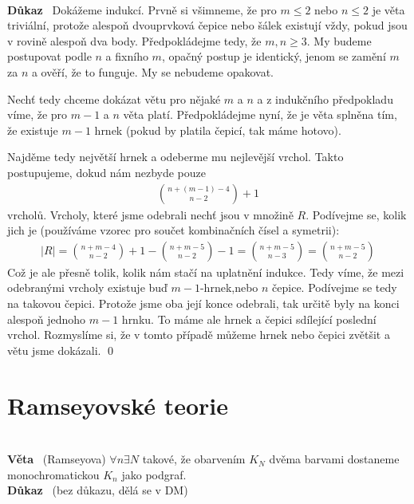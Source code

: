 \documentclass{article}
\renewcommand{\paragraph}[1]{\ \\\smallskip\noindent\textbf{#1}\ }
\begin{document}
\paragraph{Důkaz} Dokážeme indukcí. Prvně si všimneme, že pro $m\leq 2$ nebo 
$n\leq 2$ je věta triviální, protože alespoň dvouprvková čepice nebo šálek 
existují vždy, pokud jsou v rovině alespoň dva body. Předpokládejme tedy, že 
$m,n\geq 3$. My budeme postupovat podle $n$ a fixního $m$, opačný postup je 
identický, jenom se zamění $m$ za $n$ a ověří, že to funguje. My se nebudeme 
opakovat.

Nechť tedy chceme dokázat větu pro nějaké $m$ a $n$ a z indukčního předpokladu 
víme, že pro $m-1$ a $n$ věta platí. Předpokládejme nyní, že je věta splněna 
tím, že existuje $m-1$ hrnek (pokud by platila čepicí, tak máme hotovo).

Najděme tedy největší hrnek a odeberme mu nejlevější vrchol. Takto postupujeme, 
dokud nám nezbyde pouze
\begin{align}
	\binom{n+(m-1)-4}{n-2} + 1
\end{align}
vrcholů. Vrcholy, které jsme odebrali nechť jsou v množině $R$. Podívejme se, 
kolik jich je (používáme vzorec pro součet kombinačních čísel a symetrii):
\begin{align}
	|R| = \binom{n+m-4}{n-2} + 1 - \binom{n+m-5}{n-2} - 1 = \binom{n+m-5}{n-3} = 
	\binom{n+m-5}{n-2}
\end{align}
Což je ale přesně tolik, kolik nám stačí na uplatnění indukce. Tedy víme, že 
mezi odebranými vrcholy existuje buď $m-1$-hrnek,nebo $n$ čepice. Podívejme se 
tedy na takovou čepici. Protože jsme oba její konce odebrali, tak určitě byly na 
konci alespoň jednoho $m-1$ hrnku. To máme ale hrnek a čepici sdílející poslední 
vrchol. Rozmyslíme si, že v tomto případě můžeme hrnek nebo čepici zvětšit a 
větu jsme dokázali. \qed


\section{Ramseyovské teorie}
\paragraph{Věta} (Ramseyova) $\forall n \exists N$ takové, že obarvením $K_N$ 
dvěma barvami dostaneme monochromatickou $K_n$ jako podgraf.
\paragraph{Důkaz} (bez důkazu, dělá se v DM)
\end{document}

